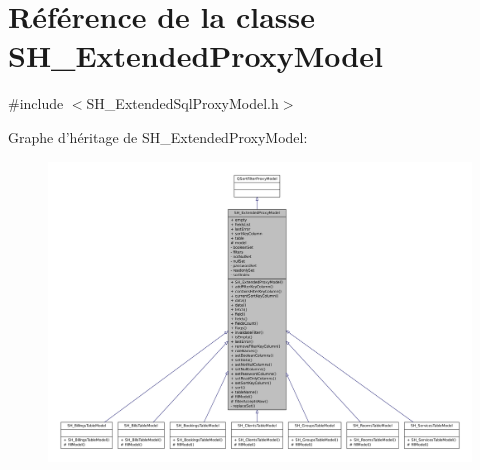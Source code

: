 \hypertarget{classSH__ExtendedProxyModel}{\section{Référence de la classe S\-H\-\_\-\-Extended\-Proxy\-Model}
\label{classSH__ExtendedProxyModel}
}


{\ttfamily \#include $<$S\-H\-\_\-\-Extended\-Sql\-Proxy\-Model.\-h$>$}



Graphe d'héritage de S\-H\-\_\-\-Extended\-Proxy\-Model\-:\nopagebreak
\begin{figure}[H]
\begin{center}
\leavevmode
\includegraphics[width=350pt]{classSH__ExtendedProxyModel__inherit__graph}
\end{center}
\end{figure}


